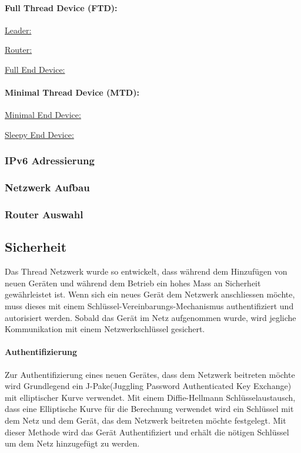 \paragraph{Full Thread Device (FTD): }

\underline{Leader:}

\underline{Router:}

\underline{Full End Device:}

\paragraph{Minimal Thread Device (MTD): }

\underline{Minimal End Device:}

\underline{Sleepy End Device:}

\subsubsection{IPv6 Adressierung}\label{subsubsec:IPv6Adressierung}

\subsubsection{Netzwerk Aufbau}\label{subsubsec:NetzwerkAufbau}

\subsubsection{Router Auswahl}\label{subsubsec:RouterAuswahl}
\newpage

\subsection{Sicherheit}\label{subsec:Sicherheit}
Das Thread Netzwerk wurde so entwickelt, dass während dem Hinzufügen von neuen Geräten und während dem Betrieb ein hohes Mass an Sicherheit gewährleistet ist. Wenn sich ein neues Gerät dem Netzwerk anschliessen möchte, muss dieses mit einem Schlüssel-Vereinbarungs-Mechanismus authentifiziert und autorisiert werden. Sobald das Gerät im Netz aufgenommen wurde, wird jegliche Kommunikation mit einem Netzwerkschlüssel gesichert.

\paragraph{Authentifizierung}
Zur Authentifizierung eines neuen Gerätes, dass dem Netzwerk beitreten möchte wird Grundlegend ein J-Pake(Juggling Password Authenticated Key Exchange) mit elliptischer Kurve verwendet. Mit einem Diffie-Hellmann Schlüsselaustausch, dass eine Elliptische Kurve für die Berechnung verwendet wird ein Schlüssel mit dem Netz und dem Gerät, das dem Netzwerk beitreten möchte festgelegt. Mit dieser Methode wird das Gerät Authentifiziert und erhält die nötigen Schlüssel um dem Netz hinzugefügt zu werden. \cite[Seite 1-4]{thread_group_inc_thread_2017}


